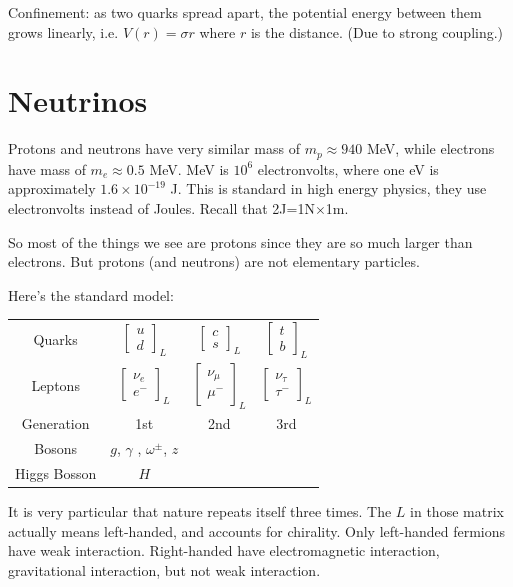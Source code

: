 \documentclass{book}
\begin{document}
{Confinement: as two quarks spread apart, the
potential energy between them grows
linearly, i.e. $V(r)=\sigma r$ where $r$ is
the distance. (Due to strong
coupling.)

\section{Neutrinos}
\label{section-neutrinos}


Protons and neutrons have very similar mass
of $m_p\approx940$ MeV, while
electrons have mass of $m_e \approx 0.5$ MeV.
MeV is $10^{6}$ electronvolts,
where one eV is approximately $1.6\times
10^{-19}$ J. This is standard in high
energy physics, they use electronvolts
instead of Joules. Recall that
2J=1N$\times$1m.

So most of the things we see are protons
since they are so much larger than
electrons. But protons (and neutrons) are not
elementary particles.

Here's the standard model:
\begin{tabular}{c c c c}
Quarks & $\begin{bmatrix} u\\d
\end{bmatrix}_L $ & $\begin{bmatrix} c\\s
\end{bmatrix}_L$ & $\begin{bmatrix} t\\b
\end{bmatrix}_L$\\
Leptons & $\begin{bmatrix} \nu_e\\e^-
\end{bmatrix}_L $ & $\begin{bmatrix}
\nu_\mu\\ \mu^-
\end{bmatrix}_L$ & $\begin{bmatrix}
\nu_\tau\\ \tau^- \end{bmatrix}_L$\\
Generation & 1st & 2nd & 3rd\\
Bosons & $g$, $\gamma$ , $\omega^\pm$, $z$ \\
Higgs Bosson & $H$
\end{tabular}
It is very particular that nature repeats
itself three times. The $L$ in those
matrix actually means left-handed, and
accounts for chirality. Only left-handed
fermions have weak interaction. Right-handed
have electromagnetic interaction,
gravitational interaction, but not weak
interaction.

}
\end{document}
